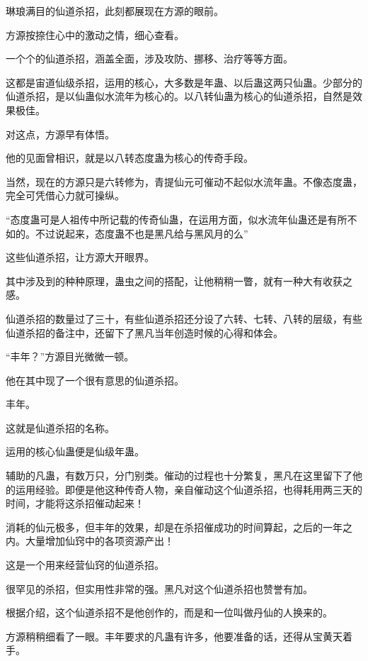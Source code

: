 
\begin{this_body}



琳琅满目的仙道杀招，此刻都展现在方源的眼前。

方源按捺住心中的激动之情，细心查看。

一个个的仙道杀招，涵盖全面，涉及攻防、挪移、治疗等等方面。

这都是宙道仙级杀招，运用的核心，大多数是年蛊、以后蛊这两只仙蛊。少部分的仙道杀招，是以仙蛊似水流年为核心的。以八转仙蛊为核心的仙道杀招，自然是效果极佳。

对这点，方源早有体悟。

他的见面曾相识，就是以八转态度蛊为核心的传奇手段。

当然，现在的方源只是六转修为，青提仙元可催动不起似水流年蛊。不像态度蛊，完全可凭借心力就可操纵。

“态度蛊可是人祖传中所记载的传奇仙蛊，在运用方面，似水流年仙蛊还是有所不如的。不过说起来，态度蛊不也是黑凡给与黑风月的么”

这些仙道杀招，让方源大开眼界。

其中涉及到的种种原理，蛊虫之间的搭配，让他稍稍一瞥，就有一种大有收获之感。

仙道杀招的数量过了三十，有些仙道杀招还分设了六转、七转、八转的层级，有些仙道杀招的备注中，还留下了黑凡当年创造时候的心得和体会。

“丰年？”方源目光微微一顿。

他在其中现了一个很有意思的仙道杀招。

丰年。

这就是仙道杀招的名称。

运用的核心仙蛊便是仙级年蛊。

辅助的凡蛊，有数万只，分门别类。催动的过程也十分繁复，黑凡在这里留下了他的运用经验。即便是他这种传奇人物，亲自催动这个仙道杀招，也得耗用两三天的时间，才能将这杀招催动起来！

消耗的仙元极多，但丰年的效果，却是在杀招催成功的时间算起，之后的一年之内。大量增加仙窍中的各项资源产出！

这是一个用来经营仙窍的仙道杀招。

很罕见的杀招，但实用性非常的强。黑凡对这个仙道杀招也赞誉有加。

根据介绍，这个仙道杀招不是他创作的，而是和一位叫做丹仙的人换来的。

方源稍稍细看了一眼。丰年要求的凡蛊有许多，他要准备的话，还得从宝黄天着手。


\end{this_body}
